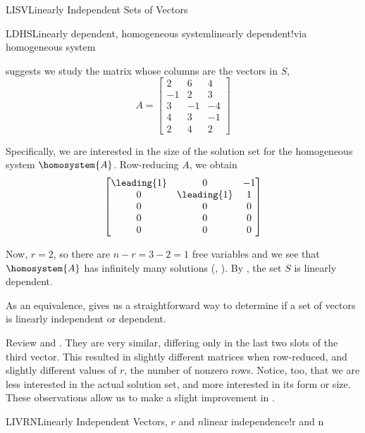 \begin{subsect}{LISV}{Linearly Independent Sets of Vectors}
\begin{example}{LDHS}{Linearly dependent, homogeneous system}{linearly dependent!via homogeneous system}
%
\begin{para} suggests we study the matrix whose columns are the vectors in $S$,
%
\begin{equation*}
A=
\begin{bmatrix}
2 & 6 & 4\\
-1 & 2 & 3\\
3 & -1 & -4\\
4 & 3 & -1\\
2 & 4 & 2
\end{bmatrix}
\end{equation*}
\end{para}
%
\begin{para}Specifically, we are interested in the size of the solution set for the homogeneous system $\homosystem{A}$.  Row-reducing $A$, we obtain
%
\begin{equation*}
\begin{bmatrix}
\leading{1} & 0 & -1\\
0 & \leading{1} & 1\\
0 & 0 & 0\\
0 & 0 & 0\\
0 & 0 & 0
\end{bmatrix}
\end{equation*}
\end{para}
%
\begin{para}Now, $r=2$, so there are $n-r=3-2=1$ free variables and we see that $\homosystem{A}$ has infinitely many solutions (, ).  By , the set $S$ is linearly dependent.\end{para}
%
\end{example}
%
\begin{para}As an equivalence,  gives us a straightforward way to determine if a set of vectors is linearly independent or dependent.\end{para}
%
\begin{para}Review  and .  They are very similar, differing only in the last two slots of the third vector.  This resulted in slightly different matrices when row-reduced, and slightly different values of $r$, the number of nonzero rows.  Notice, too, that we are less interested in the actual solution set, and more interested in its form or size.  These observations allow us to make a slight improvement in .\end{para}
%
\begin{theorem}{LIVRN}{Linearly Independent Vectors, $r$ and $n$}{linear independence!r and n}

\end{theorem}
\end{subsect}
